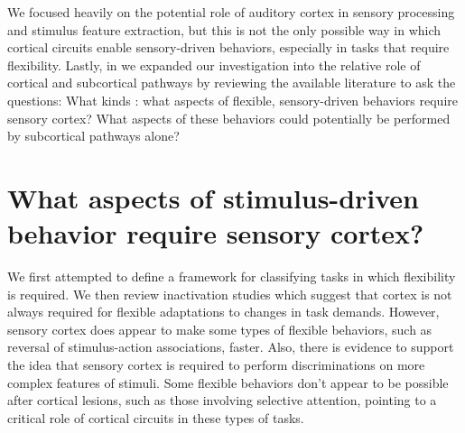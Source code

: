 We focused heavily on the potential role of auditory cortex in sensory processing and stimulus feature extraction, but this is not the only possible way in which cortical circuits enable sensory-driven behaviors, especially in tasks that require flexibility. 
%
Lastly, in \ch{\Rev} we expanded our investigation into the relative role of cortical and subcortical pathways by reviewing the available literature to ask the questions: What kinds : what aspects of flexible, sensory-driven behaviors require sensory cortex? 
%
What aspects of these behaviors could potentially be performed by subcortical pathways alone?

\section{What aspects of stimulus-driven behavior require sensory cortex?}

We first attempted to define a framework for classifying tasks in which flexibility is required. 
%
We then review inactivation studies which suggest that cortex is not always required for flexible adaptations to changes in task demands. 
%
However, sensory cortex does appear to make some types of flexible behaviors, such as reversal of stimulus-action associations, faster. 
%
Also, there is evidence to support the idea that sensory cortex is required to perform discriminations on more complex features of stimuli. 
%
Some flexible behaviors don't appear to be possible after cortical lesions, such as those involving selective attention, pointing to a critical role of cortical circuits in these types of tasks. 






